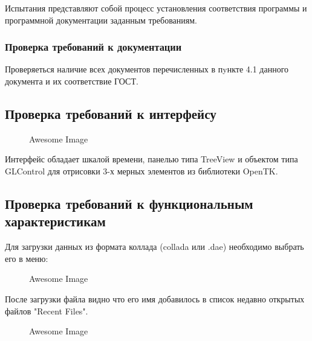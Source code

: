 Испытания представляют собой процесс установления соответствия программы и
программной документации заданным требованиям.

\subsubsection{Проверка требований к документации}
Проверяеться наличие всех документов перечисленных в пyнкте 4.1 данного документа и их соответствие ГОСТ.


\subsection{Проверка требований к интерфейсу}

\begin{figure}[h!]
    \centering
    \caption{Awesome Image}
    \label{fig:awesome_image}
\end{figure}

Интерфейс обладает шкалой времени, панелью типа TreeView и объектом типа GLControl для отрисовки 3-х мерных элементов из библиотеки OpenTK.



\subsection{Проверка требований к функциональным характеристикам}
Для загрузки данных из формата коллада (collada или .dae) необходимо выбрать его в меню:

\begin{figure}[h!]
    \centering
    \caption{Awesome Image}
    \label{fig:awesome_image}
\end{figure}



После загрузки файла видно что его имя добавилось в список недавно открытых файлов "Recent Files".

\begin{figure}[h!]
    \centering
    \caption{Awesome Image}
    \label{fig:awesome_image}
\end{figure}




